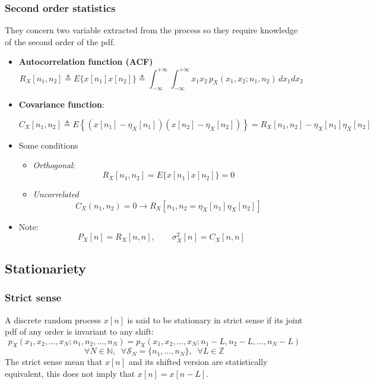\subsubsection{Second order statistics}
They concern two variable extracted from the process so they require knowledge of the second order of the pdf.
\begin{itemize}
    \item \textbf{Autocorrelation function (ACF)}
     \[
     R_X[n_1, n_2] \triangleq E\{ x[n_1] x[n_2] \} \triangleq 
     \int_{-\infty}^{+\infty} \int_{-\infty}^{+\infty} x_1 x_2\, p_X(x_1, x_2; n_1, n_2) \, dx_1 dx_2
     \]
     \item \textbf{Covariance function}:
     
     \[
C_X[n_1, n_2] \triangleq E\left\{ (x[n_1] - \eta_X[n_1])(x[n_2] - \eta_X[n_2]) \right\} = R_X[n_1, n_2] - \eta_X[n_1] \eta_X[n_2]
\]
\item Some conditions \begin{itemize}
    \item \textit{Orthogonal}: \[
    R_X[n_1,n_2]=E\{x[n_1]x[n_2]\}=0
    \]
    \item \textit{Uncorrelated}
    \[C_X(n_1,n_2)=0\rightarrow R_X[n_1,n_2=\eta_X[n_1]\eta_X[n_2]]\]
\end{itemize}
\item Note:
\[
P_X[n] = R_X[n, n], \qquad \sigma_X^2[n] = C_X[n, n]
\]


\end{itemize}
\subsection{Stationariety}
\subsubsection{Strict sense}
A discrete random process \(x[n]\) is said to be stationary in strict sense if its joint pdf of any order is invariant to any shift:
\[
p_X(x_1, x_2, \ldots, x_N; n_1, n_2, \ldots, n_N) = p_X(x_1, x_2, \ldots, x_N; n_1 - L, n_2 - L, \ldots, n_N - L)
\]
\[
\forall N \in \mathbb{N},\;\; \forall \mathcal{S}_N = \{ n_1, \ldots, n_N \},\;\; \forall L \in \mathbb{Z}
\]
The strict sense mean that \(x[n]\) and its shifted version are statistically equivalent, this does not imply that \(x[n]=x[n-L]\).
